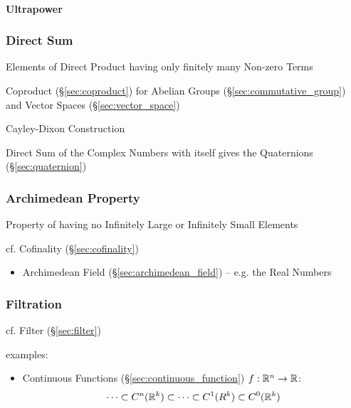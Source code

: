 \paragraph{Ultrapower}\label{sec:ultrapower}\hfill



\subsubsection{Direct Sum}\label{sec:direct_sum}

Elements of Direct Product having only finitely many Non-zero Terms

Coproduct (\S\ref{sec:coproduct}) for Abelian Groups
(\S\ref{sec:commutative_group}) and Vector Spaces (\S\ref{sec:vector_space})

Cayley-Dixon Construction

Direct Sum of the Complex Numbers with itself gives the Quaternions
(\S\ref{sec:quaternion})



\subsubsection{Archimedean Property}\label{sec:archimedean_property}

Property of having no Infinitely Large or Infinitely Small Elements

cf. Cofinality (\S\ref{sec:cofinality})

\begin{itemize}
  \item Archimedean Field (\S\ref{sec:archimedean_field}) -- e.g. the Real
    Numbers
\end{itemize}



\subsubsection{Filtration}\label{sec:filtration}

cf. Filter (\S\ref{sec:filter})

examples:
\begin{itemize}
  \item Continuous Functions (\S\ref{sec:continuous_function})
    $f : \mathbb{R}^n \rightarrow \mathbb{R}$:
    \[
      \cdots \subset C^n(\mathbb{R}^k) \subset \cdots \subset C^1(R^k) \subset
        C^0(\mathbb{R}^k)
    \]
\end{itemize}



